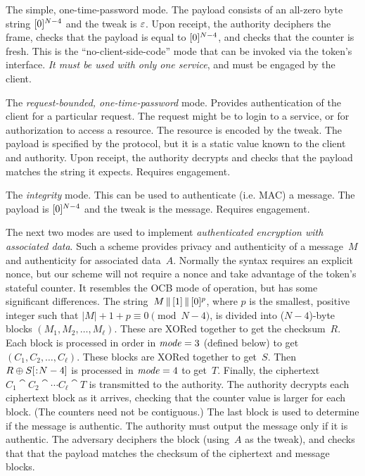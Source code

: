 %
The simple, one-time-password mode. The payload consists of an all-zero byte
string $\byte(0)^{N-4}$ and the tweak is $\varepsilon$. Upon receipt, the
authority deciphers the frame, checks that the payload is equal to
$\byte(0)^{N-4}$, and checks that the counter is fresh. This is the
``no-client-side-code'' mode that can be invoked via the token's 
interface. \emph{It must be used with only one service}, and must be engaged by
the client.

%
The \emph{request-bounded, one-time-password} mode. Provides authentication of the
client for a particular request. The request might be to login to a service, or
for authorization to access a resource. The resource is encoded by the tweak.
The payload is specified by the protocol, but it is a static value known to the
client and authority. Upon receipt, the authority decrypts and checks that the
payload matches the string it expects.
%
Requires engagement.

 The \emph{integrity} mode. This
can be used to authenticate (i.e. MAC) a message. The payload is
$\byte(0)^{N-4}$ and the tweak is the message.
%
Requires engagement.

The next two modes are used to implement \emph{authenticated encryption with
associated data}. Such a scheme provides privacy and authenticity of a
message~$M$ and authenticity for associated data~$A$. Normally the syntax
requires an explicit nonce, but our scheme will not require a nonce and take
advantage of the token's stateful counter. It resembles the OCB mode of
operation, but has some significant differences.
%
The string~$M\cat\byte(1)\cat\byte(0)^p$, where $p$ is the smallest, positive
integer such that $|M| + 1 + p \equiv 0 \pmod{N-4}$, is divided into
($N-4$)-byte blocks $(M_1, M_2, \ldots, M_\ell)$.  These are XORed together to
get the checksum~$R$.
%
Each block is processed in order in $\mathit{mode}=3$ (defined below) to get $(C_1, C_2,
\ldots, C_\ell)$. These blocks are XORed together to get~$S$. Then
$R \xor \substr(S,,N-4)$ is processed in $\mathit{mode}=4$ to get~$T$.  Finally, the
ciphertext $C_1 \cat C_2 \cat \cdots C_\ell \cat T$ is transmitted to the
authority.
%
The authority decrypts each ciphertext block as it arrives, checking that the
counter value is larger for each block. (The counters need not be contiguous.)
The last block is used to determine if the message is authentic. The authority
must output the message only if it is authentic. The adversary deciphers the
block (using~$A$ as the tweak), and checks that that the payload matches the
checksum of the ciphertext and message blocks.
%

